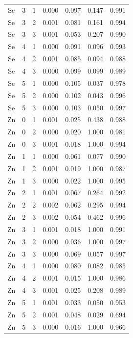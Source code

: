 \documentclass[ms, hidelinks]{uncgdissertationexp}
\theoremstyle{plain}
\theoremstyle{definition}
\theoremstyle{remark}
\begin{document}
\begin{longtable}{ccccccc}
Se & 3 & 1 & 0.000 & 0.097 & 0.147 & 0.991\\
\rowcolor{gray!6}  Se & 3 & 2 & 0.001 & 0.081 & 0.161 & 0.994\\
Se & 3 & 3 & 0.001 & 0.053 & 0.207 & 0.990\\
\rowcolor{gray!6}  Se & 4 & 1 & 0.000 & 0.091 & 0.096 & 0.993\\
Se & 4 & 2 & 0.001 & 0.085 & 0.094 & 0.988\\
\rowcolor{gray!6}  Se & 4 & 3 & 0.000 & 0.099 & 0.099 & 0.989\\
Se & 5 & 1 & 0.000 & 0.105 & 0.037 & 0.978\\
\rowcolor{gray!6}  Se & 5 & 2 & 0.000 & 0.102 & 0.043 & 0.996\\
Se & 5 & 3 & 0.000 & 0.103 & 0.050 & 0.997\\
\rowcolor{gray!6}  Zn & 0 & 1 & 0.001 & 0.025 & 0.438 & 0.988\\
Zn & 0 & 2 & 0.000 & 0.020 & 1.000 & 0.981\\
\rowcolor{gray!6}  Zn & 0 & 3 & 0.001 & 0.018 & 1.000 & 0.994\\
Zn & 1 & 1 & 0.000 & 0.061 & 0.077 & 0.990\\
\rowcolor{gray!6}  Zn & 1 & 2 & 0.001 & 0.019 & 1.000 & 0.987\\
Zn & 1 & 3 & 0.000 & 0.022 & 1.000 & 0.995\\
\rowcolor{gray!6}  Zn & 2 & 1 & 0.001 & 0.067 & 0.264 & 0.992\\
Zn & 2 & 2 & 0.002 & 0.062 & 0.295 & 0.994\\
\rowcolor{gray!6}  Zn & 2 & 3 & 0.002 & 0.054 & 0.462 & 0.996\\
Zn & 3 & 1 & 0.001 & 0.018 & 1.000 & 0.991\\
\rowcolor{gray!6}  Zn & 3 & 2 & 0.000 & 0.036 & 1.000 & 0.997\\
Zn & 3 & 3 & 0.000 & 0.069 & 0.057 & 0.997\\
\rowcolor{gray!6}  Zn & 4 & 1 & 0.000 & 0.080 & 0.082 & 0.985\\
Zn & 4 & 2 & 0.001 & 0.015 & 1.000 & 0.986\\
\rowcolor{gray!6}  Zn & 4 & 3 & 0.001 & 0.025 & 0.208 & 0.989\\
Zn & 5 & 1 & 0.001 & 0.033 & 0.050 & 0.953\\
\rowcolor{gray!6}  Zn & 5 & 2 & 0.001 & 0.048 & 0.029 & 0.694\\
Zn & 5 & 3 & 0.000 & 0.016 & 1.000 & 0.966\\*
\end{longtable}

\end{document}
